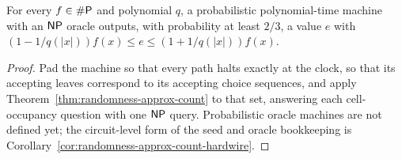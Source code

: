 \begin{theorem}[Stockmeyer]
  \label{thm:randomness-stockmeyer}
  \notready
  For every $f \in \#\mathsf{P}$ and polynomial $q$, a probabilistic
  polynomial-time machine with an $\mathsf{NP}$ oracle outputs, with probability
  at least $2/3$, a value $e$ with
  $(1 - 1/q(|x|)) f(x) \le e \le (1 + 1/q(|x|)) f(x)$.
\end{theorem}
\begin{proof}
  Pad the machine so that every path halts exactly at the clock, so that its
  accepting leaves correspond to its accepting choice sequences, and apply
  Theorem~\ref{thm:randomness-approx-count} to that set, answering each
  cell-occupancy question with one $\mathsf{NP}$ query. Probabilistic oracle
  machines are not defined yet; the circuit-level form of the seed and oracle
  bookkeeping is Corollary~\ref{cor:randomness-approx-count-hardwire}.
\end{proof}
